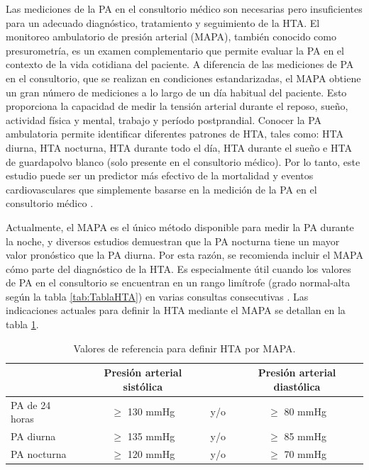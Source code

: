Las mediciones de la PA en el consultorio médico son necesarias pero insuficientes para un adecuado diagnóstico, 
tratamiento y seguimiento de la HTA. El monitoreo ambulatorio de presión arterial (MAPA), también conocido 
como presurometría, es un examen complementario que permite evaluar la PA en el contexto de la vida cotidiana 
del paciente. A diferencia de las mediciones de PA en el consultorio, que se realizan en condiciones 
estandarizadas, el MAPA obtiene un gran número de mediciones a lo largo de un día habitual del paciente. 
Esto proporciona la capacidad de medir la tensión arterial durante el reposo, sueño, actividad física y mental, 
trabajo y período postprandial. Conocer la PA ambulatoria permite identificar diferentes patrones de HTA, tales 
como: HTA diurna, HTA nocturna, HTA durante todo el día, HTA durante el sueño e HTA de guardapolvo blanco 
(solo presente en el consultorio médico). Por lo tanto, este estudio puede ser un predictor más efectivo de 
la mortalidad y eventos cardiovasculares que simplemente basarse en la medición de la PA en el 
consultorio médico \citep{CITE:7} \citep{CITE:5}.

Actualmente, el MAPA es el único método disponible para medir la PA durante la noche, y diversos estudios 
demuestran que la PA nocturna tiene un mayor valor pronóstico que la PA diurna. Por esta razón, se recomienda 
incluir el MAPA cómo parte del diagnóstico de la HTA. Es especialmente útil cuando los valores de PA en el 
consultorio se encuentran en un rango limítrofe (grado normal-alta según la tabla \ref{tab:TablaHTA}) en 
varias consultas consecutivas \citep{CITE:7}. Las indicaciones actuales para definir la HTA mediante el MAPA se detallan 
en la tabla \ref{tab:HTA-MAPA}.

\begin{table}[h]
	\centering
	\caption[Valores de referencia para definir HTA por MAPA]{Valores de referencia para definir HTA por MAPA\protect\footnotemark.}
	\begin{tabular}{l c c c}    
		\toprule
		\textbf{} 	      & \textbf{Presión arterial sistólica} 	& \textbf{}	& \textbf{Presión arterial diastólica}  \\
		\midrule
    PA de 24 horas     &  $\geq$ 130 mmHg                     & 	y/o			&  $\geq$ 80 mmHg \\	
    PA diurna          &  $\geq$ 135 mmHg                     & 	y/o			&  $\geq$ 85 mmHg \\	
    PA nocturna        &  $\geq$ 120 mmHg                     & 	y/o			&  $\geq$ 70 mmHg \\	
		\bottomrule
		\hline
	\end{tabular}
	\label{tab:HTA-MAPA}
\end{table}


